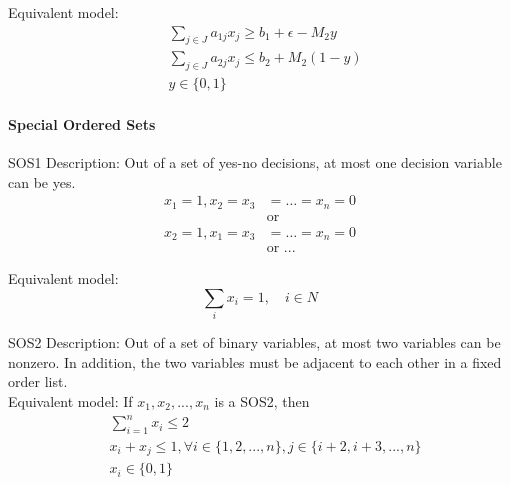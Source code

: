                 Equivalent model:
                \begin{align*}
                    & \sum_{j\in J} a_{1j} x_j \ge b_1 + \epsilon -  M_2y  \\
                    & \sum_{j\in J} a_{2j} x_j \le b_2 + M_2(1-y)  \\
                    & y \in \{0, 1\} 
                \end{align*} 
            
            \paragraph{Special Ordered Sets}
                SOS1 Description: Out of a set of yes-no decisions, at most one decision variable can be yes. \
                \begin{align*}
                    x_1=1,x_2=x_3&=\dots=x_n=0  \\
                    &\text{or}  \\
                    x_2=1, x_1=x_3&=\dots=x_n=0  \\
                    &\text{or ...} 
                \end{align*} 
                
                Equivalent model:
                \begin{equation*} \sum_{i} x_i = 1, \quad i \in N \end{equation*}
                
                SOS2 Description: Out of a set of binary variables, at most two variables can be nonzero. In addition, the two variables must be adjacent to each other in a fixed order list.\\
                
                Equivalent model:
                If $x_1, x_2, ... , x_n$ is a SOS2, then
                \begin{align*}
                    & \sum_{i=1}^{n} x_i \le 2  \\
                    & x_i + x_j \le 1, \forall i \in \{1, 2,..., n\}, j \in \{i+2, i+3, ..., n\}  \\
                    &x_i \in \{0, 1\}
                \end{align*}
                                
